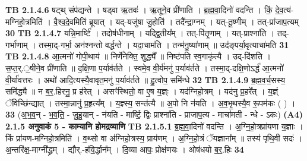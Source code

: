 \documentclass[17pt]{extarticle}
\begin{document}
                  \newline
                                \textbf{ TB 2.1.4.6} \newline
                  षट्थ् संप॑द्यन्ते । षड्वा ऋ॒तवः॑ । ऋ॒तूने॒व प्री॑णाति । ब्र॒ह्म॒वा॒दिनो॑ वदन्ति । किं॒ दे॒व॒त्य॑-मग्निहो॒त्रमिति॑ । वै॒श्व॒दे॒वमिति॑ ब्रूयात् । यद्-यजु॑षा जु॒होति॑ । तदै᳚न्द्रा॒ग्नम् । यत्-तू॒ष्णीम् । तत्-प्रा॑जाप॒त्यम् \textbf{ 30} \newline
                  \newline
                                \textbf{ TB 2.1.4.7} \newline
                  यन्नि॒मार्ष्टि॑ । तदोष॑धीनाम् । यद्द्वि॒तीय᳚म् । तत्-पि॑तृ॒णाम् । यत्-प्राश्ना॑ति । तद्-गर्भा॑णाम् । तस्मा॒द्-गर्भा॒ अन॑श्नन्तो वर्द्धन्ते । यदा॒चाम॑ति । तन्म॑नु॒ष्या॑णाम् ॥ उद॑ङ्पर्या॒वृत्याचा॑मति \textbf{ 31} \newline
                  \newline
                                \textbf{ TB 2.1.4.8} \newline
                  आ॒त्मनो॑ गोपी॒थाय॑ ॥ निर्णे॑नेक्ति॒ शुद्ध्यै᳚ ॥ निष्ट॑पति स्व॒गाकृ॑त्यै । उद्-दि॑शति । स॒प्त॒र्.॒षीने॒व प्री॑णाति ॥ द॒क्षि॒णा प॒र्याव॑र्तते । स्वमे॒व वी॒र्य॑मनु॑ प॒र्याव॑र्तते । तस्मा॒द्-दक्षि॒णोऽर्द्ध॑ आ॒त्मनो॑ वी॒र्या॑वत्तरः । अथो॑ आदि॒त्यस्यै॒वावृत॒मनु॑ प॒र्याव॑र्तते ॥ हु॒त्वोप॒ समि॑न्धे \textbf{ 32} \newline
                  \newline
                                \textbf{ TB 2.1.4.9} \newline
                  ब्र॒ह्म॒व॒र्च॒सस्य॒ समि॑द्ध्यै ॥ न ब॒र॒.हिरनु॒ प्र ह॑रेत् । असꣳ॑स्थितो॒ वा ए॒ष य॒ज्ञ्ः । यद॑ग्निहो॒त्रम् । यद॑नु प्र॒हरे᳚त् । य॒ज्ञ्ं ॅविच्छि॑न्द्यात् । तस्मा॒न्नानु॑ प्र॒हृत्य᳚म् । य॒ज्ञ्स्य॒ सन्त॑त्यै ॥ अ॒पो नि न॑यति । अ॒व॒भृ॒थस्यै॒व रू॒पम॑कः ( ) । \textbf{ 33} \newline
                  \newline
                                    (अ॒भ॒व॒न् - भ॒व॒ति॒ - जु॒हु॒यान् - न॑यति - मार्ष्टि॒ द्विः प्राश्ना॑ति - प्राजाप॒त्य - माचा॑मती - न्धे - ऽकः) \textbf{(A4)} \newline \newline
                \textbf{ 2.1.5      अनुवाकं   5 - काम्यानि होमद्रव्याणि} \newline
                                \textbf{ TB 2.1.5.1} \newline
                  ब्र॒ह्म॒वा॒दिनो॑ वदन्ति । अ॒ग्नि॒हो॒त्रप्रा॑यणा य॒ज्ञाः । किं प्रा॑यण-मग्निहो॒त्रमिति॑ । व॒थ्सो वा अ॑ग्निहो॒त्रस्य॒ प्राय॑णम् । अ॒ग्नि॒हो॒त्रं ॅयज्ञाना᳚म् ॥ तस्य॑ पृथि॒वी सदः॑ । अ॒न्तरि॑क्ष॒-माग्नी᳚द्ध्रम् । द्यौर्.-ह॑वि॒र्द्धान᳚म् । दि॒व्या आपः॒ प्रोक्ष॑णयः । ओष॑धयो ब॒र॒.हिः \textbf{ 34} \newline
\end{document}
